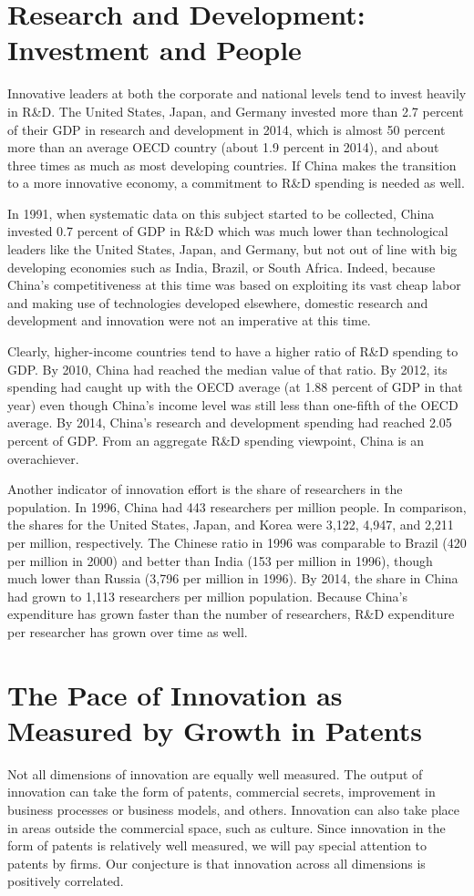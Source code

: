 \documentclass{article}
\begin{document}
    \section*{Research and Development: Investment and People}
    Innovative leaders at both the corporate and national levels tend to invest heavily in R\&D. The United States, Japan, and Germany invested more than 2.7 percent of their GDP in research and development in 2014, which is almost 50 percent more than an average OECD country (about 1.9 percent in 2014), and about three times as much as most developing countries. If China makes the transition to a more innovative economy, a commitment to R\&D spending is needed as well.

    In 1991, when systematic data on this subject started to be collected, China invested 0.7 percent of GDP in R\&D which was much lower than technological leaders like the United States, Japan, and Germany, but not out of line with big developing economies such as India, Brazil, or South Africa. Indeed, because China’s competitiveness at this time was based on exploiting its vast cheap labor and making use of technologies developed elsewhere, domestic research and development and innovation were not an imperative at this time.

    Clearly, higher-income countries tend to have a higher ratio of R\&D spending to GDP. By 2010, China had reached the median value of that ratio. By 2012, its spending had caught up with the OECD average (at 1.88 percent of GDP in that year) even though China’s income level was still less than one-fifth of the OECD average. By 2014, China’s research and development spending had reached 2.05 percent of GDP. From an aggregate R\&D spending viewpoint, China is an overachiever.

    Another indicator of innovation effort is the share of researchers in the population. In 1996, China had 443 researchers per million people. In comparison, the shares for the United States, Japan, and Korea were 3,122, 4,947, and 2,211 per million, respectively. The Chinese ratio in 1996 was comparable to Brazil (420 per million in 2000) and better than India (153 per million in 1996), though much lower than Russia (3,796 per million in 1996). By 2014, the share in China had grown to 1,113 researchers per million population. Because China’s expenditure has grown faster than the number of researchers, R\&D expenditure per researcher has grown over time as well.
    \section*{The Pace of Innovation as Measured by Growth in Patents}
    Not all dimensions of innovation are equally well measured. The output of innovation can take the form of patents, commercial secrets, improvement in business processes or business models, and others. Innovation can also take place in areas outside the commercial space, such as culture. Since innovation in the form of patents is relatively well measured, we will pay special attention to patents by firms. Our conjecture is that innovation across all dimensions is positively correlated.
\end{document}
